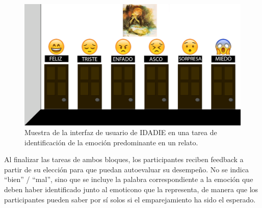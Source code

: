\documentclass[spanish]{textolivre}
\begin{document}
\begin{enumerate}
\begin{figure}[h!]
    \centering
    \includegraphics[width=0.85\linewidth]{Fig2.png}
    \caption{Muestra de la interfaz de usuario de IDADIE en una tarea de identificación de la emoción predominante en un relato.}
    \label{fig2}
\end{figure}
\end{enumerate}

Al finalizar las tareas de ambos bloques, los participantes reciben feedback a partir de su elección para que puedan autoevaluar su desempeño. No se indica “bien” / “mal”, sino que se incluye la palabra correspondiente a la emoción que deben haber identificado junto al emoticono que la representa, de manera que los participantes pueden saber por sí solos si el emparejamiento ha sido el esperado.
\end{document}

